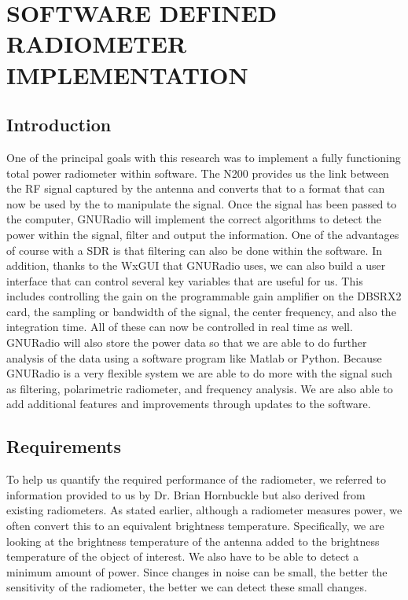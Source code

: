 \chapter{SOFTWARE DEFINED RADIOMETER IMPLEMENTATION}

\section{Introduction}
One of the principal goals with this research was to implement a fully functioning total power radiometer within software.  The N200 provides us the link between the RF signal captured by the antenna and converts that to a format that can now be used by the to manipulate the signal.  Once the signal has been passed to the computer, GNURadio will implement the correct algorithms to detect the power within the signal, filter and output the information.  One of the advantages of course with a SDR is that filtering can also be done within the software.  In addition, thanks to the WxGUI that GNURadio uses, we can also build a user interface that can control several key variables that are useful for us.  This includes controlling the gain on the programmable gain amplifier on the DBSRX2 card, the sampling or bandwidth of the signal, the center frequency, and also the integration time.  All of these can now be controlled in real time as well.  GNURadio will also store the power data so that we are able to do further analysis of the data using a software program like Matlab or Python.  Because GNURadio is a very flexible system we are able to do more with the signal such as filtering, polarimetric  radiometer, and frequency analysis.  We are also able to add additional features and improvements through updates to the software.

\section{Requirements}

To help us quantify the required performance of the radiometer, we referred to information provided to us by Dr. Brian Hornbuckle but also derived from existing radiometers.  As stated earlier, although a radiometer measures power, we often convert this to an equivalent brightness temperature.  Specifically, we are looking at the brightness temperature of the antenna added to the brightness temperature of the object of interest.  We also have to be able to detect a minimum amount of power.  Since changes in noise can be small, the better the sensitivity of the radiometer, the better we can detect these small changes.  

